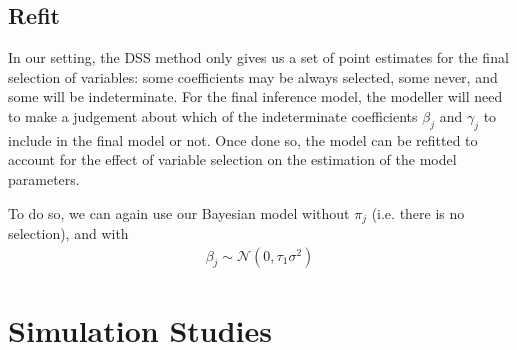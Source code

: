 \documentclass[preprint,12pt]{elsarticle}
\begin{document}

\subsection{Refit}

In our setting, the DSS method only gives us a set of point estimates for the final selection of variables: some coefficients may be always selected, some never, and some will be indeterminate. For the final inference model, the modeller will need to make a judgement about which of the indeterminate coefficients $\beta_j$ and $\gamma_j$ to include in the final model or not. Once done so, the model can be refitted to account for the effect of variable selection on the estimation of the model parameters.

To do so, we can again use our Bayesian model without $\pi_j$ (i.e. there is no selection), and with
\begin{align}
\beta_j\sim\mathcal{N}(0,\tau_1\sigma^2)
\end{align}

\section{Simulation Studies}\label{sec:sim}
\end{document}

